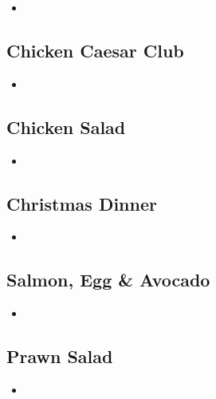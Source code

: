 \documentclass[11pt, english]{article}
\begin{document}
	\begin{itemize}
	\setlength\itemsep{0cm}
		\item 
	\end{itemize}

\newpage

	\subsection{Chicken Caesar Club}

	\begin{itemize}
	\setlength\itemsep{0cm}
		\item 
	\end{itemize}

\newpage

	\subsection{Chicken Salad}

	\begin{itemize}
	\setlength\itemsep{0cm}
		\item 
	\end{itemize}

\newpage

	\subsection{Christmas Dinner}

	\begin{itemize}
	\setlength\itemsep{0cm}
		\item 
	\end{itemize}

\newpage
	
	\subsection{Salmon, Egg \& Avocado}

	\begin{itemize}
	\setlength\itemsep{0cm}
		\item 
	\end{itemize}

\newpage

	\subsection{Prawn Salad}

	\begin{itemize}
	\setlength\itemsep{0cm}
		\item 
	\end{itemize}
\end{document}
